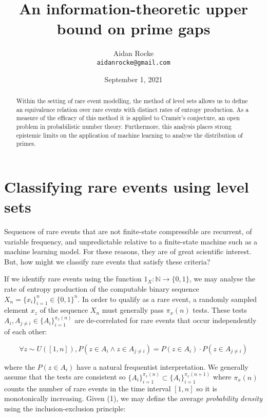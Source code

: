 \documentclass{article}
\title{An information-theoretic upper bound on prime gaps}
\date{September 1, 2021}
\author{%
  Aidan Rocke\\
  \texttt{aidanrocke@gmail.com} \\
}
\begin{document}
\maketitle

\begin{abstract}
Within the setting of rare event modelling, the method of level sets allows 
us to define an equivalence relation over rare events with distinct rates of entropy production. As a measure of the efficacy of this method it is applied to Cramér's conjecture, an open problem in probabilistic number theory. Furthermore, this analysis places strong epistemic limits on the
application of machine learning to analyse the distribution of primes.
\end{abstract}

\section{Classifying rare events using level sets}
 
Sequences of rare events that are not finite-state compressible are recurrent, of variable frequency, and unpredictable relative to a finite-state machine such as a machine learning model. For these reasons, they are of great scientific interest. But, how might we classify rare events that satisfy these criteria? 

If we identify rare events using the function $1_X: \mathbb{N} \rightarrow \{0,1\}$, we may analyse the rate of
entropy production of the computable binary sequence $X_n = \{x_i\}_{i=1}^n \in \{0,1\}^n$. In order to qualify as a rare event, a randomly sampled element $x_z$ of the sequence $X_n$ must generally
pass $\pi_x(n)$ tests. These tests $A_i, A_{j \neq i} \in \{A_i\}_{i=1}^{\pi_x(n)}$ are de-correlated for rare events that occur independently of each other: 

\begin{equation}
\forall z \sim U([1,n]), P(z \in A_i \land z \in A_{j \neq i}) = P(z \in A_i ) \cdot P(z \in A_{j \neq i})
\end{equation}

where the $P(z \in A_i )$ have a natural frequentist interpretation. We generally assume that the tests are consistent so $\{A_i\}_{i=1}^{\pi_x(n)} \subset \{A_i\}_{i=1}^{\pi_x(n+1)}$ where $\pi_{x}(n)$ counts the number of rare events in the time interval $[1,n]$ so it is monotonically increasing. Given (1), we may define the average \textit{probability density} using the inclusion-exclusion principle:
\end{document}
